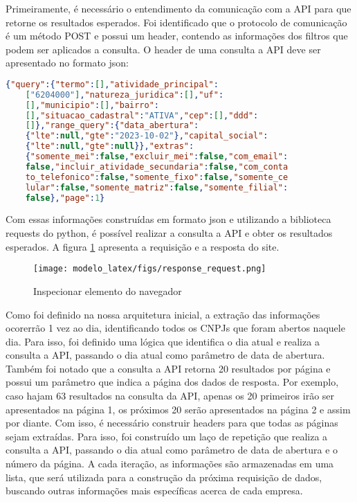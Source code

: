 Primeiramente, é necessário o entendimento da comunicação com a API para que retorne os resultados esperados. Foi identificado que o protocolo de comunicação é um método POST e possui um header, contendo as informações dos filtros que podem ser aplicados a consulta.
O header de uma consulta a API deve ser apresentado no formato json:

\begin{lstlisting}[language=json]
    {"query":{"termo":[],"atividade_principal":
    ["6204000"],"natureza_juridica":[],"uf":
    [],"municipio":[],"bairro":
    [],"situacao_cadastral":"ATIVA","cep":[],"ddd":
    []},"range_query":{"data_abertura":
    {"lte":null,"gte":"2023-10-02"},"capital_social":
    {"lte":null,"gte":null}},"extras":
    {"somente_mei":false,"excluir_mei":false,"com_email":
    false,"incluir_atividade_secundaria":false,"com_conta
    to_telefonico":false,"somente_fixo":false,"somente_ce
    lular":false,"somente_matriz":false,"somente_filial":
    false},"page":1}
    \end{lstlisting}
    

Com essas informações construídas em formato json e utilizando a biblioteca requests do python, é possível realizar a consulta a API e obter os resultados esperados. A figura \ref{fig:request_response} apresenta a requisição e a resposta do site.

\begin{figure}[H]
    \centering
    \texttt{[image: modelo\_latex/figs/response\_request.png]}
    \caption{Inspecionar elemento do navegador}
    \label{fig:request_response}
\end{figure}

Como foi definido na nossa arquitetura inicial, a extração das informações ocorerrão 1 vez ao dia, identificando todos os CNPJs que foram abertos naquele dia. Para isso, foi definido uma lógica que identifica o dia atual e realiza a consulta a API, passando o dia atual como parâmetro de data de abertura. Também foi notado que a consulta a API retorna 20 resultados por página e possui um parâmetro que indica a página dos dados de resposta. Por exemplo, caso hajam 63 resultados na consulta da API, apenas os 20 primeiros irão ser apresentados na página 1, os próximos 20 serão apresentados na página 2 e assim por diante. Com isso, é necessário construir headers para que todas as páginas sejam extraídas. Para isso, foi construído um laço de repetição que realiza a consulta a API, passando o dia atual como parâmetro de data de abertura e o número da página. A cada iteração, as informações são armazenadas em uma lista, que será utilizada para a construção da próxima requisição de dados, buscando outras informações mais específicas acerca de cada empresa.


